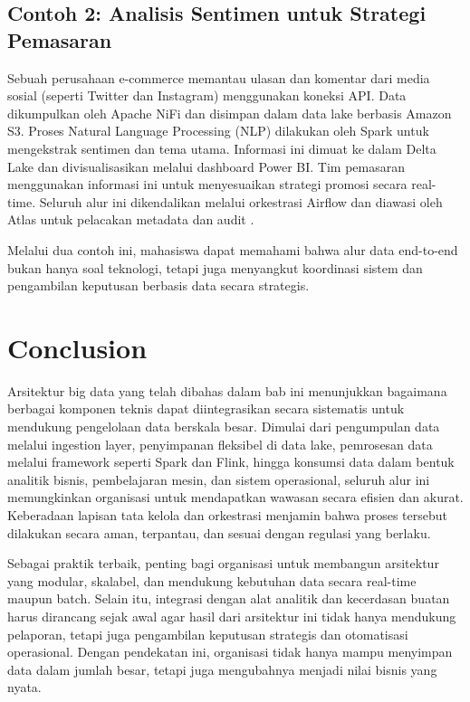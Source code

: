 \subsection*{Contoh 2: Analisis Sentimen untuk Strategi Pemasaran}

Sebuah perusahaan e-commerce memantau ulasan dan komentar dari media sosial (seperti Twitter dan Instagram) menggunakan koneksi API. Data dikumpulkan oleh Apache NiFi dan disimpan dalam data lake berbasis Amazon S3. Proses Natural Language Processing (NLP) dilakukan oleh Spark untuk mengekstrak sentimen dan tema utama. Informasi ini dimuat ke dalam Delta Lake dan divisualisasikan melalui dashboard Power BI. Tim pemasaran menggunakan informasi ini untuk menyesuaikan strategi promosi secara real-time. Seluruh alur ini dikendalikan melalui orkestrasi Airflow dan diawasi oleh Atlas untuk pelacakan metadata dan audit \cite{alam2017twitter}.

Melalui dua contoh ini, mahasiswa dapat memahami bahwa alur data end-to-end bukan hanya soal teknologi, tetapi juga menyangkut koordinasi sistem dan pengambilan keputusan berbasis data secara strategis.




\section{Conclusion}

Arsitektur big data yang telah dibahas dalam bab ini menunjukkan bagaimana berbagai komponen teknis dapat diintegrasikan secara sistematis untuk mendukung pengelolaan data berskala besar. Dimulai dari pengumpulan data melalui ingestion layer, penyimpanan fleksibel di data lake, pemrosesan data melalui framework seperti Spark dan Flink, hingga konsumsi data dalam bentuk analitik bisnis, pembelajaran mesin, dan sistem operasional, seluruh alur ini memungkinkan organisasi untuk mendapatkan wawasan secara efisien dan akurat. Keberadaan lapisan tata kelola dan orkestrasi menjamin bahwa proses tersebut dilakukan secara aman, terpantau, dan sesuai dengan regulasi yang berlaku.

Sebagai praktik terbaik, penting bagi organisasi untuk membangun arsitektur yang modular, skalabel, dan mendukung kebutuhan data secara real-time maupun batch. Selain itu, integrasi dengan alat analitik dan kecerdasan buatan harus dirancang sejak awal agar hasil dari arsitektur ini tidak hanya mendukung pelaporan, tetapi juga pengambilan keputusan strategis dan otomatisasi operasional. Dengan pendekatan ini, organisasi tidak hanya mampu menyimpan data dalam jumlah besar, tetapi juga mengubahnya menjadi nilai bisnis yang nyata.

